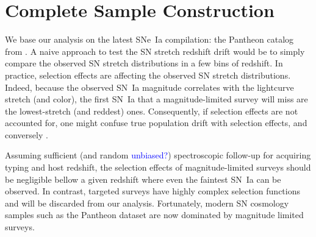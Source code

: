 \documentclass[]{aa} %
\newcommand{\nn}[1]{{\textcolor[rgb]{1, 0.27, 0}{#1}}}
\newcommand{\yc}[1]{{\textcolor{blue}{#1}}}
\begin{document}

\section{Complete Sample Construction}
\label{sec:sample}

We base our analysis on the latest SNe~Ia compilation: the Pantheon catalog from
\cite{scolnic2018a}. A naive approach to test the SN stretch redshift drift
would be to simply compare the observed SN stretch distributions in a few bins
of redshift.  In practice, selection effects are affecting the observed SN
stretch distributions. Indeed, because the observed SN~Ia magnitude correlates
with the lightcurve stretch (and color), the first SN~Ia that a
magnitude-limited survey will miss are the lowest-stretch (and reddest) ones.
Consequently, if selection effects are not accounted for, one might confuse true
population drift with selection effects, and conversely \nn{\citep[e.g.,][]{kim19}}.

\nn{Assuming} sufficient (and random \yc{unbiased?}) spectroscopic follow-up for acquiring
typing and host redshift, the selection effects of magnitude-limited surveys
should be negligible bellow a given redshift where even the faintest \nn{SN~Ia}
can be observed. In contrast, targeted surveys have highly complex selection
functions and will be discarded from our analysis. Fortunately, modern SN
cosmology samples such as the Pantheon dataset are now dominated by magnitude
limited surveys.
\end{document}
